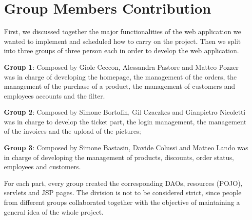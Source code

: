 \section{Group Members Contribution}

First, we discussed together the major functionalities of the web application we wanted to implement and scheduled how to carry on the project.
Then we split into three groups of three person each in order to develop the web application.


\begin{description}
	\item \textbf{Group 1}: Composed by Giole Ceccon, Alessandra Pastore and Matteo Pozzer was in charge of developing the homepage, the management of the orders, the management of the purchase of a product, the management of customers and employees accounts and the filter.
	\item \textbf{Group 2}: Composed by Simone Bortolin, Gil Czaczkes and Gianpietro Nicoletti was in charge to develop the ticket part, the login management, the management of the invoices and the upload of the pictures;
	\item \textbf{Group 3}: Composed by Simone Bastasin, Davide Colussi and Matteo Lando was in charge of developing the management of products, discounts, order status, employees and customers.

For each part, every group created the corresponding DAOs, resources (POJO), servlets and JSP pages.
The division is not to be considered strict, since people from different groups collaborated together with the objective of maintaining a general idea of the whole project.

\end{description}